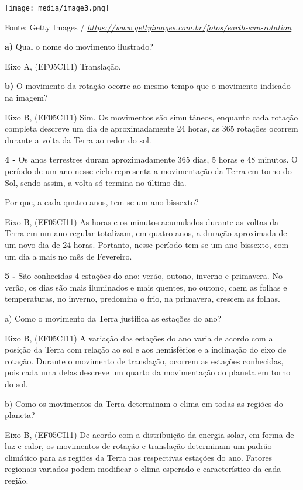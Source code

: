 \texttt{[image: media/image3.png]}

Fonte: Getty Images /
\href{https://www.gettyimages.com.br/fotos/earth-sun-rotation}{\emph{https://www.gettyimages.com.br/fotos/earth-sun-rotation}}

\textbf{a)} Qual o nome do movimento ilustrado?

Eixo A, (EF05CI11) Translação.

\textbf{b)} O movimento da rotação ocorre ao mesmo tempo que o movimento
indicado na imagem?

Eixo B, (EF05CI11) Sim. Os movimentos são simultâneos, enquanto cada
rotação completa descreve um dia de aproximadamente 24 horas, as 365
rotações ocorrem durante a volta da Terra ao redor do sol.

\textbf{4 -} Os anos terrestres duram aproximadamente 365 dias, 5 horas
e 48 minutos. O período de um ano nesse ciclo representa a movimentação
da Terra em torno do Sol, sendo assim, a volta só termina no último dia.

Por que, a cada quatro anos, tem-se um ano bissexto?

Eixo B, (EF05CI11) As horas e os minutos acumulados durante as voltas da
Terra em um ano regular totalizam, em quatro anos, a duração aproximada
de um novo dia de 24 horas. Portanto, nesse período tem-se um ano
bissexto, com um dia a mais no mês de Fevereiro.

\textbf{5 -} São conhecidas 4 estações do ano: verão, outono, inverno e
primavera. No verão, os dias são mais iluminados e mais quentes, no
outono, caem as folhas e temperaturas, no inverno, predomina o frio, na
primavera, crescem as folhas.

a) Como o movimento da Terra justifica as estações do ano?

Eixo B, (EF05CI11) A variação das estações do ano varia de acordo com a
posição da Terra com relação ao sol e aos hemisférios e a inclinação do
eixo de rotação. Durante o movimento de translação, ocorrem as estações
conhecidas, pois cada uma delas descreve um quarto da movimentação do
planeta em torno do sol.

b) Como os movimentos da Terra determinam o clima em todas as regiões do
planeta?

Eixo B, (EF05CI11) De acordo com a distribuição da energia solar, em
forma de luz e calor, os movimentos de rotação e translação determinam
um padrão climático para as regiões da Terra nas respectivas estações do
ano. Fatores regionais variados podem modificar o clima esperado e
característico da cada região.

